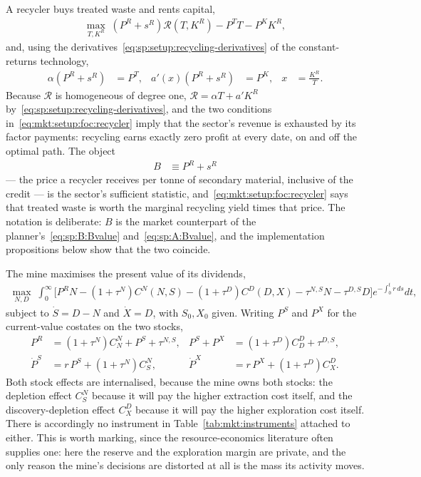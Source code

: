  A recycler buys treated waste and rents capital,
\begin{align}
\max_{T,K^R}\;\left(P^R+s^R\right)\mathcal R\left(T,K^R\right)-P^TT-P^KK^R,
\label{eq:mkt:setup:recycler}
\end{align}
and, using the derivatives~\eqref{eq:sp:setup:recycling-derivatives} of the constant-returns
technology,
\begin{align}
\alpha\left(P^R+s^R\right) &= P^T,
&
a'\!\left(x\right)\left(P^R+s^R\right) &= P^K,
&
x&=\frac{K^R}{T}.
\label{eq:mkt:setup:foc:recycler}
\end{align}
Because $\mathcal R$ is homogeneous of degree one, $\mathcal R=\alpha T+a'K^R$
by~\eqref{eq:sp:setup:recycling-derivatives}, and the two conditions
in~\eqref{eq:mkt:setup:foc:recycler} imply that the sector's revenue is exhausted by its factor
payments: recycling earns exactly zero profit at every date, on and off the optimal path. The object
\begin{align}
B &\equiv P^R+s^R
\label{eq:mkt:setup:Bvalue}
\end{align}
--- the price a recycler receives per tonne of secondary material, inclusive of the credit --- is the
sector's sufficient statistic, and~\eqref{eq:mkt:setup:foc:recycler} says that treated waste is worth
the marginal recycling yield times that price. The notation is deliberate: $B$ is the market
counterpart of the planner's~\eqref{eq:sp:B:Bvalue} and~\eqref{eq:sp:A:Bvalue}, and the implementation
propositions below show that the two coincide.

 The mine maximises the present value of its dividends,
\begin{align}
\max_{N,D}\;\int_0^\infty\Big[P^RN-\left(1+\tau^N\right)C^N\!\left(N,S\right)
-\left(1+\tau^D\right)C^D\!\left(D,X\right)-\tau^{N,S}N-\tau^{D,S}D\Big]
e^{-\int_0^tr\,ds}dt,
\label{eq:mkt:setup:mine}
\end{align}
subject to $\dot S=D-N$ and $\dot X=D$, with $S_0,X_0$ given. Writing $P^S$ and $P^X$ for the
current-value costates on the two stocks,
\begin{align}
P^R &= \left(1+\tau^N\right)C^N_N+P^S+\tau^{N,S},
&
P^S+P^X &= \left(1+\tau^D\right)C^D_D+\tau^{D,S},
\label{eq:mkt:setup:foc:mine}
\\
\dot P^S &= r\,P^S+\left(1+\tau^N\right)C^N_S,
&
\dot P^X &= r\,P^X+\left(1+\tau^D\right)C^D_X .
\label{eq:mkt:setup:costate:mine}
\end{align}
Both stock effects are internalised, because the mine owns both stocks: the depletion effect $C^N_S$
because it will pay the higher extraction cost itself, and the discovery-depletion effect $C^D_X$
because it will pay the higher exploration cost itself. There is accordingly no instrument in
Table~\ref{tab:mkt:instruments} attached to either. This is worth marking, since the resource-economics
literature often supplies one: here the reserve and the exploration margin are private, and the only
reason the mine's decisions are distorted at all is the mass its activity moves.


